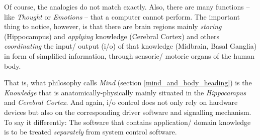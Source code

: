 Of course, the analogies do not match exactly. Also, there are many functions
-- like \emph{Thought} or \emph{Emotions} -- that a computer cannot perform.
The important thing to notice, however, is that there are brain regions mainly
\emph{storing} (Hippocampus) and \emph{applying} knowledge (Cerebral Cortex) and
others \emph{coordinating} the input/ output (i/o) of that knowledge (Midbrain,
Basal Ganglia) in form of simplified information, through sensoric/ motoric
organs of the human body.

That is, what philosophy calls \emph{Mind} (section \ref{mind_and_body_heading})
is the \emph{Knowledge} that is anatomically-physically mainly situated in the
\emph{Hippocampus} and \emph{Cerebral Cortex}. And again, i/o control does not
only rely on hardware devices but also on the corresponding driver software and
signalling mechanism. To say it differently: The software that contains
application/ domain knowledge is to be treated \emph{separately} from system
control software.
